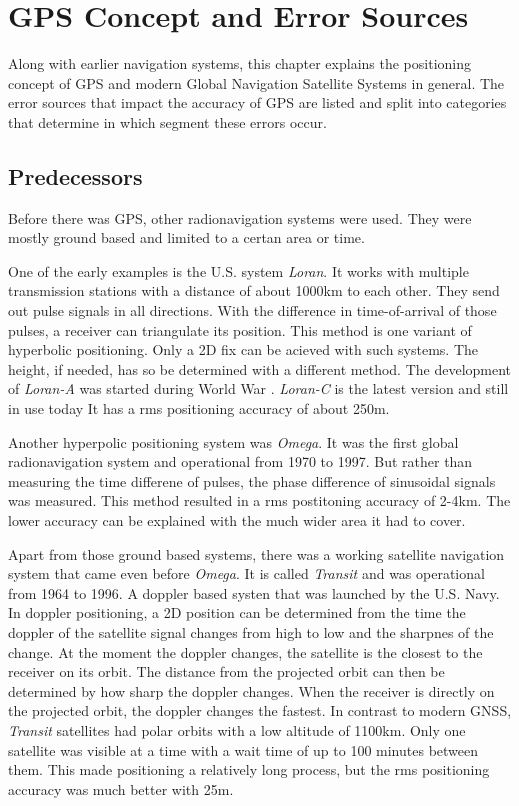 \chapter{GPS Concept and Error Sources}\label{ch:GPS_concept}

Along with earlier navigation systems, this chapter explains the positioning concept of GPS and modern Global Navigation Satellite Systems in general.
The error sources that impact the accuracy of GPS are listed and split into categories that determine in which segment these errors occur.


\section{Predecessors}
Before there was GPS, other radionavigation systems were used.
They were mostly ground based and limited to a certan area or time.

One of the early examples is the U.S. system \textit{Loran}.
It works with multiple transmission stations with a distance of about 1000km to each other.
They send out pulse signals in all directions.
With the difference in time-of-arrival of those pulses, a receiver can triangulate its position.
This method is one variant of hyperbolic positioning.
Only a 2D fix can be acieved with such systems.
The height, if needed, has so be determined with a different method.
The development of \textit{Loran-A} was started during World War .
\textit{Loran-C} is the latest version and still in use today
It has a rms positioning accuracy of about 250m.

Another hyperpolic positioning system was \textit{Omega}.
It was the first global radionavigation system and operational from 1970 to 1997.
But rather than measuring the time differene of pulses, the phase difference of sinusoidal signals was measured.
This method resulted in a rms postitoning accuracy of 2-4km.
The lower accuracy can be explained with the much wider area it had to cover.

Apart from those ground based systems, there was a working satellite navigation system that came even before \textit{Omega}.
It is called \textit{Transit} and was operational from 1964 to 1996.
A doppler based systen that was launched by the U.S. Navy.
In doppler positioning, a 2D position can be determined from the time the doppler of the satellite signal changes from high to low and the sharpnes of the change.
At the moment the doppler changes, the satellite is the closest to the receiver on its orbit.
The distance from the projected orbit can then be determined by how sharp the doppler changes.
When the receiver is directly on the projected orbit, the doppler changes the fastest.
In contrast to modern GNSS, \textit{Transit} satellites had polar orbits with a low altitude of 1100km.
Only one satellite was visible at a time with a wait time of up to 100 minutes between them.
This made positioning a relatively long process, but the rms positioning accuracy was much better with 25m.

